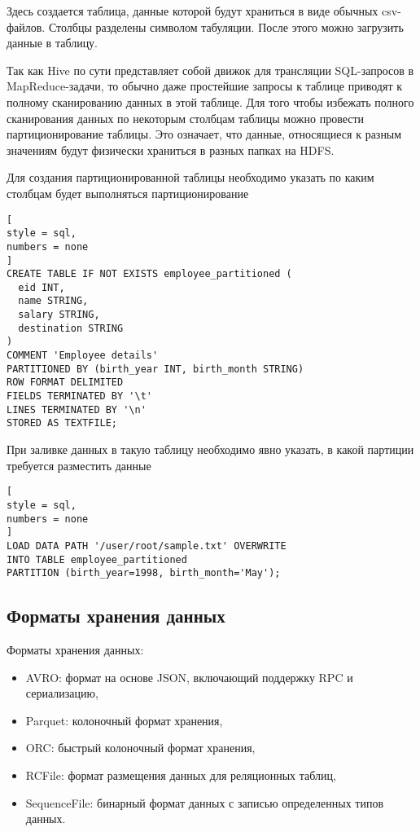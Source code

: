 \documentclass[%
	11pt,
	a4paper,
	utf8,
		]{article}
\begin{document}
Здесь создается таблица, данные которой будут храниться в виде обычных csv-файлов. Столбцы разделены символом табуляции. После этого можно загрузить данные в таблицу.

Так как Hive по сути представляет собой движок для трансляции SQL-запросов в MapReduce-задачи, то обычно даже простейшие запросы к таблице приводят к полному сканированию данных в этой таблице. Для того чтобы избежать полного сканирования данных по некоторым столбцам таблицы можно провести партиционирование таблицы. Это означает, что данные, относящиеся к разным значениям будут физически храниться в разных папках на HDFS.

Для создания партиционированной таблицы необходимо указать по каким столбцам будет выполняться партиционирование
\begin{lstlisting}[
style = sql,
numbers = none
]
CREATE TABLE IF NOT EXISTS employee_partitioned (
  eid INT,
  name STRING,
  salary STRING,
  destination STRING
)
COMMENT 'Employee details'
PARTITIONED BY (birth_year INT, birth_month STRING)
ROW FORMAT DELIMITED
FIELDS TERMINATED BY '\t'
LINES TERMINATED BY '\n'
STORED AS TEXTFILE;
\end{lstlisting}

При заливке данных в такую таблицу необходимо явно указать, в какой партиции требуется разместить данные
\begin{lstlisting}[
style = sql,
numbers = none	
]
LOAD DATA PATH '/user/root/sample.txt' OVERWRITE
INTO TABLE employee_partitioned
PARTITION (birth_year=1998, birth_month='May');
\end{lstlisting}

\subsection{Форматы хранения данных}

Форматы хранения данных:
\begin{itemize}
	\item AVRO: формат на основе JSON, включающий поддержку RPC и сериализацию,
	
	\item Parquet: колоночный формат хранения,
	
	\item ORC: быстрый колоночный формат хранения,
	
	\item RCFile: формат размещения данных для реляционных таблиц,
	
	\item SequenceFile: бинарный формат данных с записью определенных типов данных.
\end{itemize}
\end{document}
